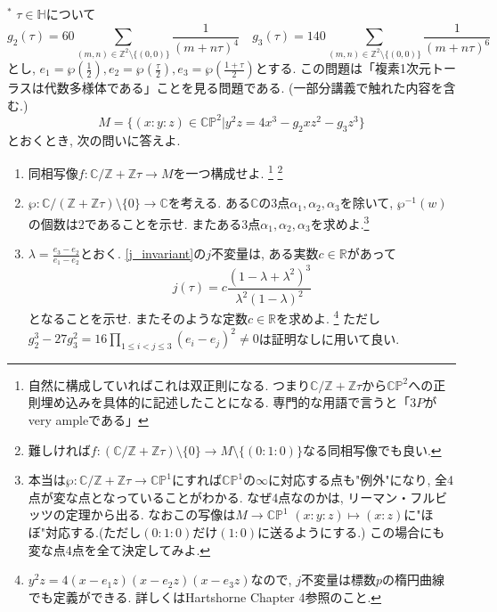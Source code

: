 \documentclass[dvipdfmx,a4paper,11pt]{article}
\newcommand{\R}{\mathbb{R}}
\newcommand{\Z}{\mathbb{Z}}
\newcommand{\C}{\mathbb{C}}
\theoremstyle{definition}
\begin{document}
 \item $^{*}$ \label{embedding} $\tau \in \mathbb{H}$について
$$ g_2(\tau) = 60\sum_{(m,n) \in \Z^2 \setminus \{ (0,0)\} }\frac{1}{(m+ n \tau)^4}
\quad
 g_3(\tau)=140 \sum_{(m,n) \in \Z^2 \setminus \{ (0,0)\} }\frac{1}{(m+ n \tau)^6} 
 $$とし, $e_1 = \wp(\frac{1}{2}), e_2 = \wp(\frac{\tau}{2}), e_3 = \wp( \frac{1+\tau}{2})$とする.
 この問題は「複素1次元トーラスは代数多様体である」ことを見る問題である. (一部分講義で触れた内容を含む.)
 $$M = \{ (x:y:z) \in \C \mathbb{P}^2 | y^2z = 4x^3 - g_2 x z^2- g_3 z^3 \}$$とおくとき, 次の問いに答えよ. 
 \begin{enumerate}
\item  同相写像$f: \C/\Z  + \Z \tau \rightarrow  M$を一つ構成せよ.
\footnote{自然に構成していればこれは双正則になる. つまり$\C/\Z+ \Z \tau $から$\C \mathbb{P}^2$への正則埋め込みを具体的に記述したことになる. 専門的な用語で言うと「$3P$がvery ampleである」}
\footnote{難しければ$f: (\C / \Z  + \Z \tau) \setminus \{ 0\} \rightarrow  M \setminus \{ (0 : 1: 0)\}$なる同相写像でも良い.}
\item $\wp : \C/(\Z  + \Z \tau) \setminus  \{ 0\}\rightarrow \C $を考える. ある$\C$の3点$\alpha_1,\alpha_2,\alpha_3$を除いて, $\wp^{-1}(w)$の個数は2であることを示せ. またある3点$\alpha_1,\alpha_2,\alpha_3$を求めよ.\footnote{本当は$\wp : \C/\Z  + \Z \tau \to \C\mathbb{P}^1$にすれば$\C\mathbb{P}^1$の$\infty$に対応する点も"例外"になり, 全4点が変な点となっていることがわかる. なぜ4点なのかは, リーマン・フルビッツの定理から出る. なおこの写像は$M \to \C\mathbb{P}^1$ $(x:y:z) \mapsto (x:z)$に"ほぼ"対応する.(ただし$(0:1:0)$だけ$(1:0)$に送るようにする.) この場合にも変な点4点を全て決定してみよ.} 
\item $\lambda = \frac{e_3 - e_2}{e_1 - e_2}$とおく. \ref{j_invariant}の$j$不変量は, ある実数$c \in \R$があって
$$
j(\tau ) = c \frac{(1 - \lambda + \lambda^2)^3}{\lambda^2 (1 - \lambda)^2}
$$
となることを示せ. またそのような定数$c \in \R$を求めよ. \footnote{$y^2 z = 4(x - e_1 z)(x - e_2 z) (x - e_3 z)$なので, $j$不変量は標数$p$の楕円曲線でも定義ができる. 詳しくはHartshorne Chapter 4参照のこと. }
ただし$g_{2}^{3} - 27 g_{3}^{2} = 16\prod_{1 \le i< j \le 3}(e_i - e_j)^2 \neq 0$は証明なしに用いて良い.
 \end{enumerate}
 
\end{document}
